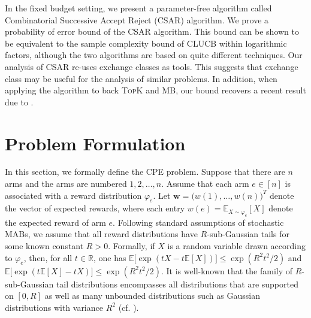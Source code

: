 \documentclass{article}
\newcommand{\wei}[1]{}
\newcommand{\wei}[1]{{\color{blue!50!black}  [\text{Wei:} #1]}}
\newcommand{\junk}[1]{}
\newcommand{\Algorithm}{{\small \textsf{CLUCB}}\xspace}
\newcommand{\AlgorithmBud}{{\small \textsf{CSAR}}\xspace}
\newcommand{\Problem}{{CPE}\xspace}
\newcommand{\Rew}{\varphi}
\newcommand{\E}{\mathbb E}
\newcommand{\RR}{\mathbb R}
\newcommand{\MultiIdent}{\textsc{TopK}\xspace}
\newcommand{\MultiBandit}{\textsc{MB}\xspace}
\renewcommand{\vec}[1]{\boldsymbol{#1}}
\begin{document}
In the fixed budget setting, we present a parameter-free algorithm called Combinatorial Successive Accept Reject (\AlgorithmBud) algorithm.
We prove a probability of error bound of the \AlgorithmBud algorithm. 
This bound can be shown to be equivalent to the sample complexity bound of \Algorithm within logarithmic factors, although the two algorithms are based on quite different techniques. 
Our analysis of \AlgorithmBud re-uses exchange classes as tools. 
This suggests that exchange class may be useful for the analysis of similar problems. 
In addition, when applying the algorithm to back \MultiIdent and \MultiBandit, our bound recovers a recent result due to \citet{bubeck2013multiple}. 

\junk{
\textbf{Useful notations.} Let $[n]$ denote the set $\{1,\ldots,n\}$. Suppose that $\vec w\in \RR^{n}$ is a vector and $E\subseteq[n]$ is a set. 
Let $w(i)$ denote the $i$-th entry of $\vec w$. 
We define $w(E) \triangleq  \sum_{i\in E} w(i)$ to be the sum of entries indexed by $E$.
}
\vspace{-0.7em}
\section{Problem Formulation}
\vspace{-0.7em}
In this section,  we formally define the \Problem problem.
Suppose that there are $n$ arms and the arms are numbered $1,2,\ldots,n$.
Assume that each arm $e\in[n]$ is associated with a reward distribution $\Rew_e$.
Let $\vec w = \big(w(1),\ldots, w(n)\big)^T$ denote the vector of expected rewards, where each entry $w(e)=\E_{X\sim \Rew_e}[X]$ denote the expected reward of arm $e$.
Following standard assumptions of stochastic MABs, we assume that all reward distributions have $R$-sub-Gaussian tails for some known constant $R>0$. 
Formally, if $X$ is a random variable drawn according to $\Rew_e$, then, for all $t\in \RR$, one has $\mathbb E\big[\exp(tX-t\mathbb E[X])\big] \le \exp(R^2t^2/2)$ and $\mathbb E\big[\exp(t\mathbb E[X]-tX)\big] \le \exp(R^2t^2/2)$.
It is well-known that the family of $R$-sub-Gaussian tail distributions encompasses all distributions that are supported on $[0,R]$ as well as many unbounded distributions such as Gaussian distributions with variance $R^2$ (cf. \citep{pollard2000asymptopia}).
\end{document}
